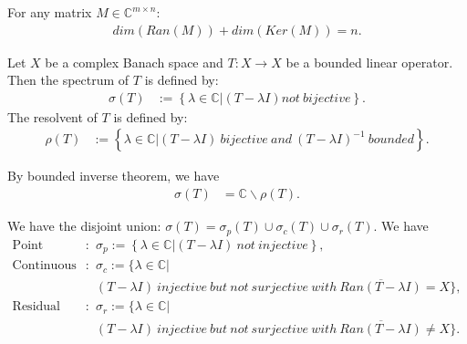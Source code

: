 \documentclass[../../note.tex]{subfiles}
\begin{document}
\begin{theorem}
    For any matrix $M \in \mathbb{C}^{m \times n}$:
    \begin{align}
        dim(Ran(M)) + dim(Ker(M)) = n.
    \end{align}
\end{theorem}

\begin{definition}
    Let $X$ be a complex Banach space and $T: X \rightarrow X$ be a bounded linear operator. Then the spectrum of $T$ is defined by:
    \begin{align}
        \sigma(T)
        &:= \left\{\lambda \in \mathbb{C} \vert (T - \lambda I) not~bijective\right\}.
    \end{align}
    The resolvent of $T$ is defined by:
    \begin{align}
        \rho(T)
        &:= \left\{\lambda \in \mathbb{C} \vert (T - \lambda I) ~bijective~and~(T - \lambda I)^{-1}~bounded \right\}.
    \end{align}
\end{definition}

\begin{corollary}
    By bounded inverse theorem, we have
    \begin{align}
        \sigma(T)
        &= \mathbb{C} \backslash \rho(T).
    \end{align}
\end{corollary}

\begin{definition}
    We have the disjoint union: $\sigma(T) = \sigma_{p}(T) \cup \sigma_{c}(T) \cup \sigma_r(T)$. We have
    \begin{align}
        \textrm{Point spectrum}:
        &\sigma_{p}:= \left\{\lambda \in \mathbb{C} \vert (T- \lambda I)~not~injective\right\}, \\
        \textrm{Continuous spectrum}:
        &\sigma_{c}:= \{\lambda \in \mathbb{C} \vert \\
        &(T- \lambda I)~injective~but~not~surjective~with~\overline{Ran(T-\lambda I)} = X \}, \\
        \textrm{Residual spectrum}:
        &\sigma_{r}:= \{\lambda \in \mathbb{C} \vert \\
        &(T- \lambda I)~injective~but~not~surjective~with~\overline{Ran(T-\lambda I)} \neq X \}. \\
    \end{align}
\end{definition}
\end{document}
